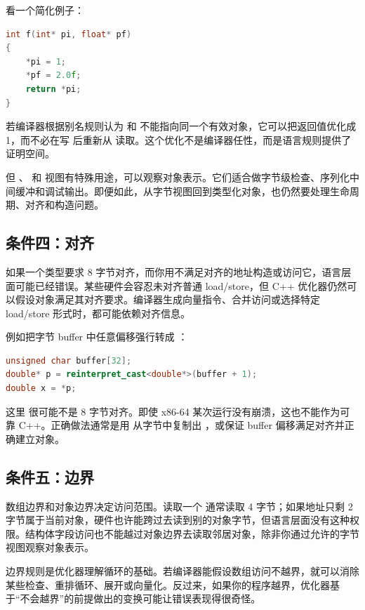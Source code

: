 看一个简化例子：

\begin{lstlisting}[language=C++]
int f(int* pi, float* pf)
{
    *pi = 1;
    *pf = 2.0f;
    return *pi;
}
\end{lstlisting}

若编译器根据别名规则认为  和  不能指向同一个有效对象，它可以把返回值优化成 1，而不必在写  后重新从  读取。这个优化不是编译器任性，而是语言规则提供了证明空间。

但 、 和  视图有特殊用途，可以观察对象表示。它们适合做字节级检查、序列化中间缓冲和调试输出。即便如此，从字节视图回到类型化对象，也仍然要处理生命周期、对齐和构造问题。

\subsection{条件四：对齐}

如果一个类型要求 8 字节对齐，而你用不满足对齐的地址构造或访问它，语言层面可能已经错误。某些硬件会容忍未对齐普通 load/store，但 C++ 优化器仍然可以假设对象满足其对齐要求。编译器生成向量指令、合并访问或选择特定 load/store 形式时，都可能依赖对齐信息。

例如把字节 buffer 中任意偏移强行转成 ：

\begin{lstlisting}[language=C++]
unsigned char buffer[32];
double* p = reinterpret_cast<double*>(buffer + 1);
double x = *p;
\end{lstlisting}

这里  很可能不是 8 字节对齐。即使 x86-64 某次运行没有崩溃，这也不能作为可靠 C++。正确做法通常是用  从字节中复制出 ，或保证 buffer 偏移满足对齐并正确建立对象。

\subsection{条件五：边界}

数组边界和对象边界决定访问范围。读取一个  通常读取 4 字节；如果地址只剩 2 字节属于当前对象，硬件也许能跨过去读到别的对象字节，但语言层面没有这种权限。结构体字段访问也不能越过对象边界去读取邻居对象，除非你通过允许的字节视图观察对象表示。

边界规则是优化器理解循环的基础。若编译器能假设数组访问不越界，就可以消除某些检查、重排循环、展开或向量化。反过来，如果你的程序越界，优化器基于“不会越界”的前提做出的变换可能让错误表现得很奇怪。

